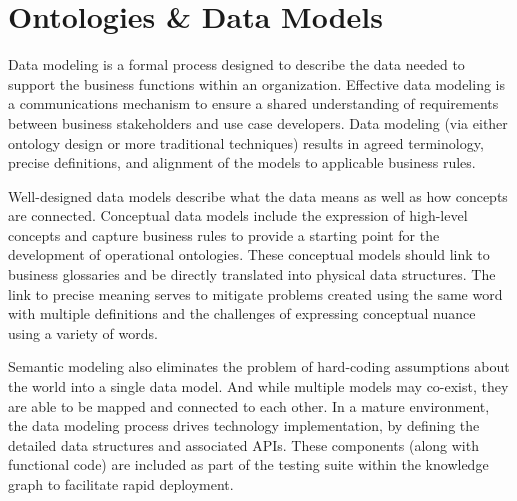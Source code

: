 \section{Ontologies \& Data Models}\label{sec:ekgmm-b-2-2} %

Data modeling is a formal process designed to describe the data needed to support the business functions within
an organization.
Effective data modeling is a communications mechanism to ensure a shared understanding of requirements between
business stakeholders and use case developers.
Data modeling (via either ontology design or more traditional techniques) results in agreed terminology, precise
definitions, and alignment of the models to applicable business rules.

\ekgmmContextSection

Well-designed data models describe what the data means as well as how concepts are connected.
Conceptual data models include the expression of high-level concepts and capture business rules to provide a starting
point for the development of operational ontologies.
These conceptual models should link to business glossaries and be directly translated into physical data structures.
The link to precise meaning serves to mitigate problems created using the same word with multiple definitions and
the challenges of expressing conceptual nuance using a variety of words.

Semantic modeling also eliminates the problem of hard-coding assumptions about the world into a single data model.
And while multiple models may co-exist, they are able to be mapped and connected to each other.
In a mature environment, the data modeling process drives technology implementation, by defining the detailed
data structures and associated APIs.
These components (along with functional code) are included as part of the testing suite within the knowledge graph
to facilitate rapid deployment.

\kgmmcorequestionssection

